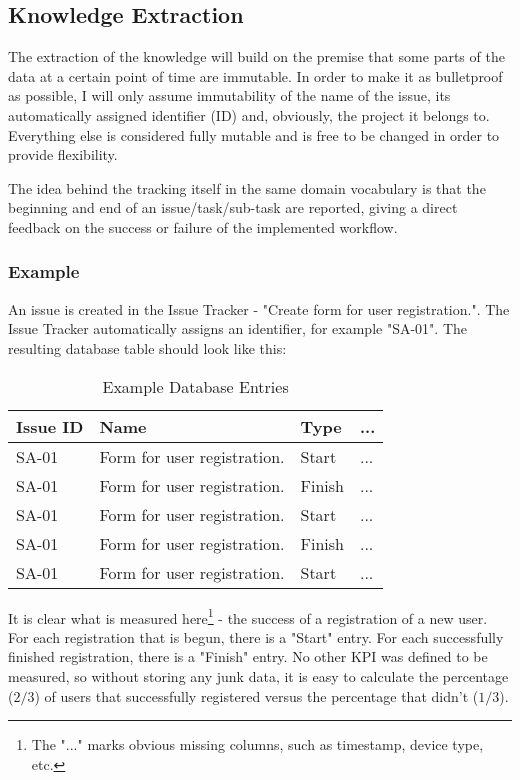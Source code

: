 \subsection{Knowledge Extraction}

The extraction of the knowledge will build on the premise that some parts of the data at a certain point of time are immutable. In order to make it as bulletproof as possible, I will only assume immutability of the name of the issue, its automatically assigned identifier (ID) and, obviously, the project it belongs to. Everything else is considered fully mutable and is free to be changed in order to provide flexibility.

The idea behind the tracking itself in the same domain vocabulary is that the beginning and end of an issue/task/sub-task are reported, giving a direct feedback on the success or failure of the implemented workflow.

\subsubsection*{Example}

An issue is created in the Issue Tracker - "Create form for user registration.". The Issue Tracker automatically assigns an identifier, for example "SA-01". The resulting database table should look like this:

\bigbreak

\begin{table}[!ht]
\begin{center}
\begin{tabular}{|l|l|l|l|}
\hline
\textbf{Issue ID} & \textbf{Name} & \textbf{Type} & \textbf{...} \\
\hline
SA-01 & Form for user registration. & Start & ... \\
\hline
SA-01 & Form for user registration. & Finish & ... \\
\hline
SA-01 & Form for user registration. & Start & ...\\
\hline
SA-01 & Form for user registration. & Finish & ... \\
\hline
SA-01 & Form for user registration. & Start & ...\\
\hline
\end{tabular}
\end{center}
\caption{Example Database Entries}
\label{tab:ex_db}
\end{table}

It is clear what is measured here\footnote{The "..." marks obvious missing columns, such as timestamp, device type, etc.} - the success of a registration of a new user. For each registration that is begun, there is a "Start" entry. For each successfully finished registration, there is a "Finish" entry. No other KPI was defined to be measured, so without storing any junk data, it is easy to calculate the percentage ($2/3$) of users that successfully registered versus the percentage that didn't ($1/3$).

